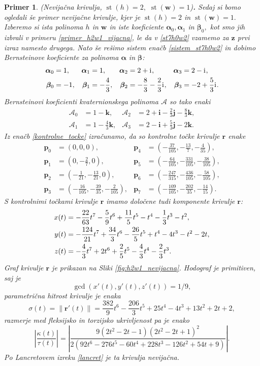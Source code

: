 \documentclass[12pt,a4paper,twoside]{article}
\newcommand{\iu}{\mathrm{i}\mkern1mu} %
\theoremstyle{definition} %
\theoremstyle{plain} %
\theoremstyle{primerstyle}
\newtheorem{primer}[definicija]{Primer}
\numberwithin{equation}{section}  %
\newcommand{\pV}{\mathbf{p}}
\newcommand{\rV}{\mathbf{r}}
\newcommand{\iV}{\mathbf{i}}
\newcommand{\jV}{\mathbf{j}}
\newcommand{\kV}{\mathbf{k}}
\newcommand{\wV}{\mathbf{w}}
\newcommand{\zV}{\mathbf{z}}
\newcommand{\AQ}{\mathcal{A}}
\newcommand{\balpha}{\boldsymbol \alpha}
\newcommand{\bbeta}{\boldsymbol \beta}
\DeclareMathOperator{\st}{st}
\begin{document}
\begin{primer}
	\label{primer_h2w1_nevijacna}
	\textnormal{ }(Nevijačna krivulja, $\st(h)=2,$ $\st(\wV)=1$)\textbf{.}
	Sedaj si bomo ogledali še primer nevijačne krivulje, kjer je $\st(h)=2$ in $\st(\wV)=1.$ Izberemo si ista polinoma $h$ in $\wV$ in iste koeficiente $\balpha_0,\balpha_1$ in $\bbeta_0,$ kot smo jih izbrali v primeru \ref{primer_h2w1_vijacna}, le da v \eqref{st7h0w2} vzamemo za $\zV$ prvi izraz namesto drugega. Nato še rešimo sistem enačb \eqref{sistem_st7h0w2} in dobimo Bernsteinove koeficiente za polinoma $\balpha$ in $\bbeta$:
	\begin{align*}
	\balpha_0&=1,&\balpha_1&=1,&\balpha_2&=2+\iu,&\balpha_3&=2-\iu,\\
		\bbeta_0&=-1,&\bbeta_1&=-\frac{4}{3},&\bbeta_2&=-\frac{8}{3}-\frac{2}{3}\iu,&\bbeta_3&=-2+\frac{5}{3}\iu.
	\end{align*}
	Bernsteinovi koeficienti kvaternionskega polinoma $\AQ$ so tako enaki
	\begin{align*}
		\AQ_0&=1-\kV,&\AQ_2&=2+\iV-\frac{2}{3}\jV-\frac{8}{3}\kV,\\
		\AQ_1&=1-\frac{4}{3}\kV,&\AQ_3&=2-\iV+\frac{5}{3}\jV-2\kV.
	\end{align*}
	Iz enačb \eqref{kontrolne_tocke} izračunamo, da so kontrolne točke krivulje $\rV$ enake
	\begin{align*}
		\pV_0&=(0,0,0),&\pV_4&=\left(-\frac{37}{105},-\frac{13}{7},-\frac{4}{35}\right)\!,\\
		\pV_1&=\left(0,-\frac{2}{7},0\right)\!,&\pV_5&=\left(-\frac{64}{105},-\frac{331}{105},-\frac{38}{105}\right)\!,\\
		\pV_2&=\left(-\frac{1}{21},-\frac{13}{21},0\right)\!,&\pV_6&=\left(-\frac{247}{315},-\frac{436}{105},-\frac{58}{105}\right)\!,\\
		\pV_3&=\left(-\frac{16}{105},-\frac{39}{35},-\frac{2}{105}\right)\!,&\pV_7&=\left(-\frac{109}{105},-\frac{202}{35},-\frac{14}{15}\right)\!.
	\end{align*}
	S kontrolnimi točkami krivulje $\rV$ imamo določene tudi komponente krivulje $\rV$:
	\begin{align}
		x(t)&=-\frac{22}{63}t^7-\frac{5}{9}t^6+\frac{11}{5}t^5-t^4-\frac{1}{3}t^3-t^2,\notag\\
		y(t)&=-\frac{124}{21}t^7+\frac{34}{3}t^6-\frac{26}{5}t^5+t^4-4t^3-t^2-2t,\label{primer_h2w1_nevijacna_krivulja}\\
		z(t)&=-\frac{4}{3}t^7+2t^6+\frac{2}{5}t^5-\frac{4}{3}t^4-\frac{2}{3}t^3.\notag
	\end{align}
	Graf krivulje $\rV$ je prikazan na Sliki \ref{fig:h2w1_nevijacna}. Hodograf je primitiven, saj je $$\gcd(x'(t),y'(t),z'(t))=1/9,$$ parametrična hitrost krivulje je enaka
	\begin{equation*}
		\sigma(t)=\lVert\rV'(t)\rVert=\frac{382}{9}t^6-\frac{206}{3}t^5+25t^4-4t^3+13t^2+2t+2,
	\end{equation*}
	razmerje med fleksijsko in torzijsko ukrivljenost pa je enako $$\left|\frac{\kappa(t)}{\tau(t)}\right|=\left|\frac{9(2t^2-2t-1)(2t^2-2t+1)^2}{2(92t^6-276t^5-60t^4+228t^3-126t^2+54t+9)}\right|\!.$$ Po Lancretovem izreku \ref{lancret} je ta krivulja nevijačna.
	

\end{primer}
\end{document}
